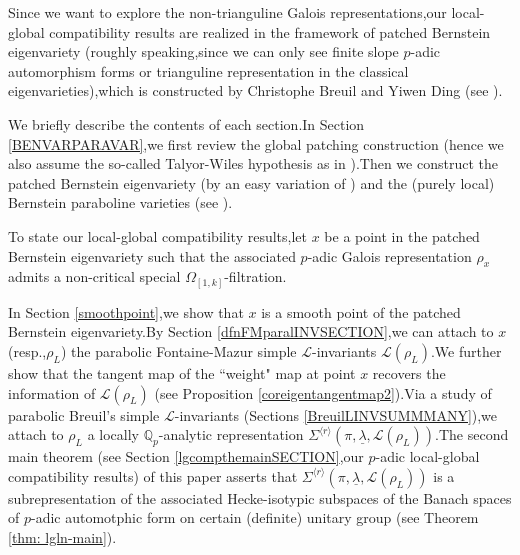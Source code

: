 \documentclass[SecEq,CM,GP]{degruyter-crelle} %
\theoremstyle{plain}
\newcommand{\lrr}{{\langle r\rangle}}
\newcommand{\omepik}{\Omega_{[1,k]}}
\newcommand{\ul}{\underline}
\newcommand{\BQ}{{\mathbb{Q}}}
\newcommand{\sL}{\mathcal L}
\begin{document}
Since we want to explore the non-trianguline Galois representations,\;our local-global compatibility results are realized in the framework of patched Bernstein eigenvariety (roughly speaking,\;since we can only see finite slope $p$-adic automorphism forms or trianguline representation in the classical eigenvarieties),\;which is constructed by Christophe Breuil and Yiwen Ding (see \cite{Ding2021}).\;

We briefly describe the contents of each section.\;In Section \ref{BENVARPARAVAR},\;we first review the global patching construction (hence we also assume the so-called Talyor-Wiles hypothesis as in \cite{PATCHING2016}).\;Then we construct the patched Bernstein eigenvariety (by an easy variation of \cite[Section 3.3]{Ding2021}) and the (purely local) Bernstein paraboline varieties (see \cite[Section 4.2]{Ding2021}).\;

To state our local-global compatibility results,\;let $x$ be a point in the patched Bernstein eigenvariety such that the associated $p$-adic Galois representation $\rho_x$ admits a non-critical special  $\omepik$-filtration.\;

In Section \ref{smoothpoint},\;we show that $x$ is a smooth point of the patched Bernstein eigenvariety.\;By Section \ref{dfnFMparalINVSECTION},\;we can attach to $x$ (resp.,\;$\rho_L$) the parabolic Fontaine-Mazur simple $\sL$-invariants $\sL(\rho_L)$.\;We further show that the tangent map of the ``weight" map at point $x$ recovers the information of $\sL(\rho_L)$ (see Proposition \ref{coreigentangentmap2}).\;Via a study of parabolic Breuil's simple $\sL$-invariants (Sections \ref{BreuilLINVSUMMMANY}),\;we attach to $\rho_L$ a locally $\BQ_p$-analytic representation $\Sigma^{\lrr}(\pi, \ul{\lambda},\sL(\rho_L))$.\;The second main theorem (see Section \ref{lgcompthemainSECTION},\;our $p$-adic local-global compatibility results) of this paper asserts that  $\Sigma^{\lrr}(\pi, \ul{\lambda},\sL(\rho_L))$ is a subrepresentation of the associated Hecke-isotypic subspaces of the Banach spaces of $p$-adic automotphic form on certain (definite) unitary group (see Theorem \ref{thm: lgln-main}).\;

\end{document}
